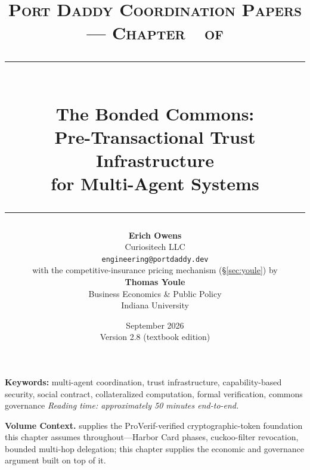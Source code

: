 \documentclass[11pt,a4paper]{article}
\title{
  \vspace{-1cm}
  {\Large\textsc{Port Daddy Coordination Papers --- Chapter~\pdchapternumber\ of \pdchaptercount}}\\[
0.5cm]
  \rule{\textwidth}{0.5pt}\\[0.3cm]
  {\LARGE\textbf{The Bonded Commons:}}\\[0.2cm]
  {\Large Pre-Transactional Trust Infrastructure\\for Multi-Agent Systems}\\[0.3cm]
  \rule{\textwidth}{0.5pt}
}
\author{
  \textbf{Erich Owens}\\[0.2cm]
  Curiositech LLC\\[0.2cm]
  \texttt{engineering@portdaddy.dev}\\[0.4cm]
  with the competitive-insurance pricing mechanism (\S\ref{sec:youle}) by\\[0.1cm]
  \textbf{Thomas Youle}\\[0.1cm]
  Business Economics \& Public Policy\\[0.1cm]
  Indiana University
}
\date{September 2026\\Version 2.8 (textbook edition)}
\theoremstyle{definition}
\theoremstyle{remark}
\begin{document}
\pdopensolutions
\setlength{\emergencystretch}{2em}
\maketitle
\thispagestyle{empty}
\vspace{1cm}
\vspace{0.5cm}
\noindent\textbf{Keywords:} multi-agent coordination, trust infrastructure, capability-based security, social contract, collateralized computation, formal verification, commons governance
\vspace{0.3cm}
\noindent\textit{Reading time: approximately 50 minutes end-to-end.}
\vspace{0.6cm}
\begin{center}
\end{center}
\vspace{0.4cm}
\vspace{0.5cm}
\noindent\textbf{Volume Context.}  supplies the ProVerif-verified cryptographic-token foundation this chapter assumes throughout---Harbor Card phases, cuckoo-filter revocation, bounded multi-hop delegation; this chapter supplies the economic and governance argument built on top of it.
\newpage
\tableofcontents
\newpage
\end{document}
